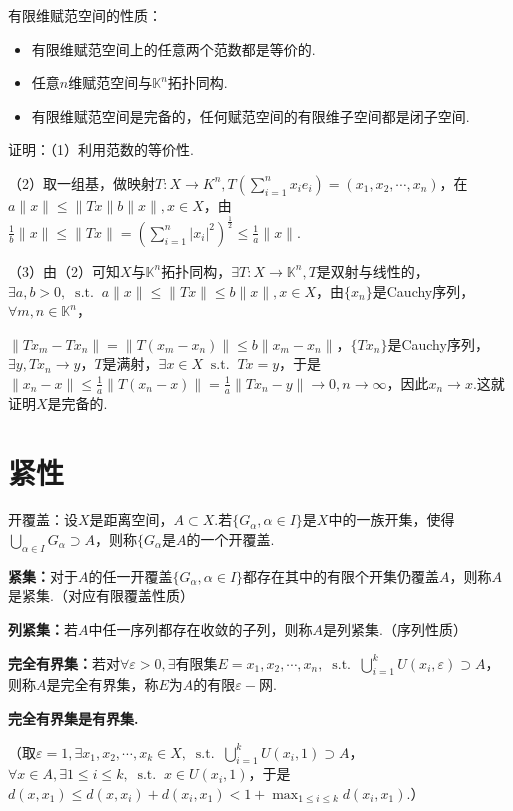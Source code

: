 \documentclass[bwprint, withoutpreface]{cumcmthesis}
\newcommand*{\st}{\mathop{}\!\mathrm{s.t.}\!\mathop{}}
\newcommand*{\norm}[1]{\| #1 \|}
\begin{document}
有限维赋范空间的性质：
\begin{itemize}[itemindent=2em]
	\item 有限维赋范空间上的任意两个范数都是等价的.
	\item 任意$n$维赋范空间与$\mathbb{K}^n$拓扑同构.
	\item 有限维赋范空间是完备的，任何赋范空间的有限维子空间都是闭子空间.
\end{itemize}

证明：（1）利用范数的等价性.

（2）取一组基，做映射$T:X \to K^{n}, T(\sum_{i = 1}^{n}{x_i e_i}) = (x_1, x_2, \cdots, x_n)$，在$a\norm{x} \leqslant \norm{Tx} b\norm{x}, x \in X$，由$\frac{1}{b}{\norm{x}} \leqslant \norm{Tx} = (\sum_{i = 1}^{n}{|x_i|^2})^\frac{1}{2} \leqslant \frac{1}{a}\norm{x}$.

（3）由（2）可知$X$与$\mathbb{K}^n$拓扑同构，$\exists T:X \to \mathbb{K}^n, T$是双射与线性的，$\exists a, b > 0, \st a \norm{x} \leqslant \norm{Tx} \leqslant b \norm{x}, x \in X$，由$\{x_n\}$是Cauchy序列，$\forall m, n \in \mathbb{K}^n$，

$\norm{Tx_m - Tx_n} = \norm{T(x_m - x_n)} \leqslant b \norm{x_m - x_n}$，$\{Tx_n\}$是Cauchy序列，$\exists y, Tx_n \to y$，$T$是满射，$\exists x \in X \st Tx = y$，于是$\norm{x_n - x} \leqslant \frac{1}{a} \norm{T(x_n - x)} = \frac{1}{a} \norm{Tx_n - y} \to 0, n \to \infty$，因此$x_n \to x.$这就证明$X$是完备的.

\section{紧性}
开覆盖：设$X$是距离空间，$A \subset X$.若$\{G_\alpha, \alpha \in I\}$是$X$中的一族开集，使得$\bigcup_{\alpha \in I}{G_{\alpha} \supset A}$，则称$\{G_{\alpha}$是$A$的一个开覆盖.

\textbf{紧集：}对于$A$的任一开覆盖$\{G_{\alpha}, \alpha \in I\}$都存在其中的有限个开集仍覆盖$A$，则称$A$是紧集.（对应有限覆盖性质）

\textbf{列紧集：}若$A$中任一序列都存在收敛的子列，则称$A$是列紧集.（序列性质）

\textbf{完全有界集：}若对$\forall \varepsilon > 0, \exists \mbox{有限集} E = {x_1, x_2, \cdots, x_n}, \st \bigcup_{i = 1}^{k}U(x_i, \varepsilon) \supset A$，则称$A$是完全有界集，称$E$为$A$的有限$\varepsilon-$网.

\textbf{完全有界集是有界集.}

（取$\varepsilon = 1, \exists x_1, x_2, \cdots, x_k \in X, \st \bigcup_{i = 1}^{k}{U(x_i, 1) \supset A}$，$\forall x \in A, \exists 1 \leqslant i \leqslant k, \st x \in U(x_i, 1)$，于是$d(x, x_1) \leqslant d(x, x_i) + d(x_i, x_1) < 1 + \max_{1 \leqslant i \leqslant k}{d(x_i, x_1)}.$）
\end{document}
